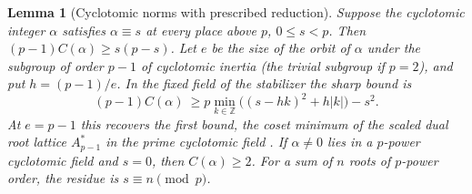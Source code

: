 \documentclass[11pt]{amsart}
\numberwithin{equation}{section}
\newtheorem{lemma}[theorem]{Lemma}
\theoremstyle{definition}
\theoremstyle{plain}
\begin{document}
\begin{lemma}[Cyclotomic norms with prescribed reduction]\label{nt:residue-norm}\label{r6:dyadic-mean}
Suppose the cyclotomic integer $\alpha$ satisfies $\alpha\equiv s$ at every place above $p$, $0\le s<p$. Then $(p-1)C(\alpha)\ge s(p-s)$. Let $e$ be the size of the orbit of $\alpha$ under the subgroup of order $p-1$ of cyclotomic inertia (the trivial subgroup if $p=2$), and put $h=(p-1)/e$. In the fixed field of the stabilizer the sharp bound is
\[
 (p-1)C(\alpha)\ \ge p\min_{k\in\mathbb Z}\big((s-hk)^2+h|k|\big)-s^2 .
\]
At $e=p-1$ this recovers the first bound, the coset minimum of the scaled dual root lattice $A_{p-1}^*$ in the prime cyclotomic field \cite[p.~86]{ConwaySloaneLattice}.
If $\alpha\ne0$ lies in a $p$-power cyclotomic field and $s=0$,
then $C(\alpha)\ge2$. For a sum of $n$ roots of $p$-power order,
the residue is $s\equiv n\pmod p$.
\end{lemma}
\end{document}
